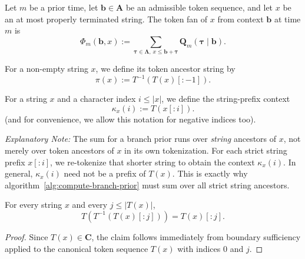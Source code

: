 \begin{definition}
\label{def:token-fan}
    Let $m$ be a prior time, let $\mathbf{b} \in \mathbf{A}$ be an admissible token sequence,
    and let $x$ be an at most properly terminated string.
    The token fan of $x$ from context $\mathbf{b}$ at time $m$ is
    \[
    \Phi_m(\mathbf{b}, x)
    :=
    \sum_{\boldsymbol{\tau}\in\mathbf{\Lambda},\,x\le \mathbf{b}+\boldsymbol{\tau}}
    \mathbf{Q}_m(\boldsymbol{\tau}\mid\mathbf{b}).
    \]
\end{definition}

\begin{definition}
    \label{def:token-ancestor}
    For a non-empty string $x$, we define its token ancestor string by
    \[
    \pi(x) := T^{-1}(T(x)[:-1]).
    \]
\end{definition}

\begin{definition}
\label{def:string-prefix-context}
    For a string $x$ and a character index $i \leq |x|$, we define the
    string-prefix context
    \[
    \kappa_x(i) := T(x[:i]).
    \]
    (and for convenience, we allow this notation for negative indices too).
\end{definition}

\textit{Explanatory Note: } The sum for a branch prior runs over \emph{string}
ancestors of $x$, not merely over token ancestors of $x$ in its own tokenization.
For each strict string prefix $x[:i]$, we re-tokenize that shorter string to obtain
the context $\kappa_x(i)$. In general, $\kappa_x(i)$ need not be a prefix of $T(x)$.
This is exactly why algorithm~\ref{alg:compute-branch-prior} must sum over all
strict string ancestors.

\begin{lemma}
\label{lemma:token-prefix-retokenization}
    For every string $x$ and every $j \leq |T(x)|$,
    \[
    T(T^{-1}(T(x)[:j])) = T(x)[:j].
    \]
\end{lemma}
\begin{proof}
    Since $T(x) \in \mathbf{C}$, the claim follows immediately from boundary sufficiency
    applied to the canonical token sequence $T(x)$ with indices $0$ and $j$.
\end{proof}

